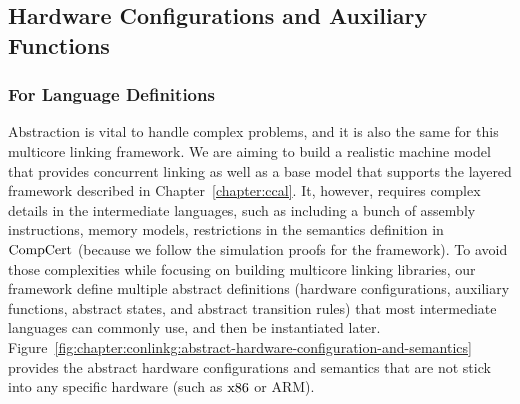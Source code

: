 \subsection{Hardware Configurations and Auxiliary Functions}
\label{chapter:linking:subsec:hardware-configuration}

\subsubsection{For Language Definitions}

Abstraction is vital to handle complex problems, and it is also the same for this multicore linking framework.
We are aiming to build a realistic machine model that provides 
concurrent linking as well as a base model that supports 
the layered framework described in Chapter~\ref{chapter:ccal}.
It, however, requires complex details in the intermediate languages, 
such as including a bunch of assembly instructions, memory models, 
restrictions in the semantics definition in $\mathrm{CompCert}$ (because we follow 
the simulation proofs for the framework).
To avoid those complexities while focusing on building multicore linking  libraries,
our framework define multiple abstract definitions (hardware configurations, auxiliary functions, 
abstract states, and abstract transition rules)
that most intermediate languages can commonly use, 
and then be instantiated later. 
Figure~\ref{fig:chapter:conlinkg:abstract-hardware-configuration-and-semantics} provides the 
abstract hardware configurations and semantics that are
not stick into any specific hardware (such as $\mathrm{x86}$ or ARM). 

